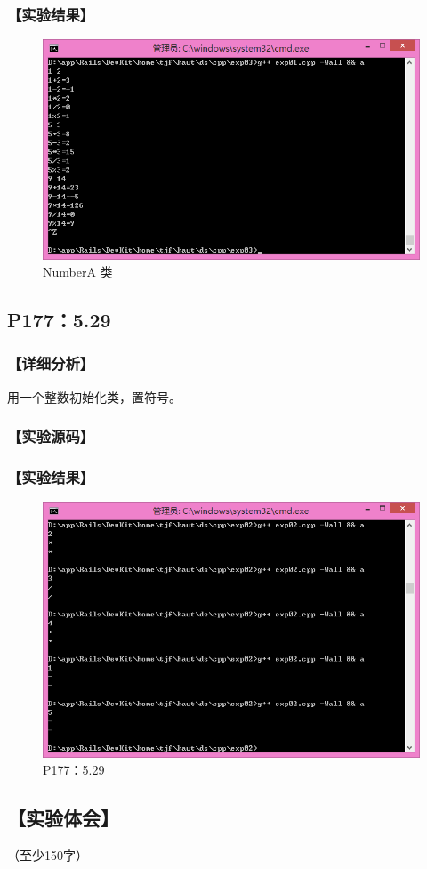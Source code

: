 \subsubsection*{【实验结果】}
\begin{figure}[htp]
\centering
\includegraphics[width=\textwidth]{exp03/exp01.png}
\caption{\label{out03_01}NumberA 类}
\end{figure}

\subsection{P177：5.29}
\subsubsection*{【详细分析】}
用一个整数初始化类，置符号。
\subsubsection*{【实验源码】}
{\linespread{1}}
\subsubsection*{【实验结果】}
\begin{figure}[htp]
\centering
\includegraphics[width=\textwidth]{exp02/exp02.png}
\caption{\label{out03_02}P177：5.29}
\end{figure}

\subsection*{【实验体会】}
（至少150字）
